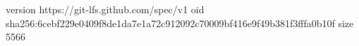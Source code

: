 version https://git-lfs.github.com/spec/v1
oid sha256:6cebf229e0409f8de1da7e1a72c912092c70009bf416e9f49b381f3fffa0b10f
size 5566
